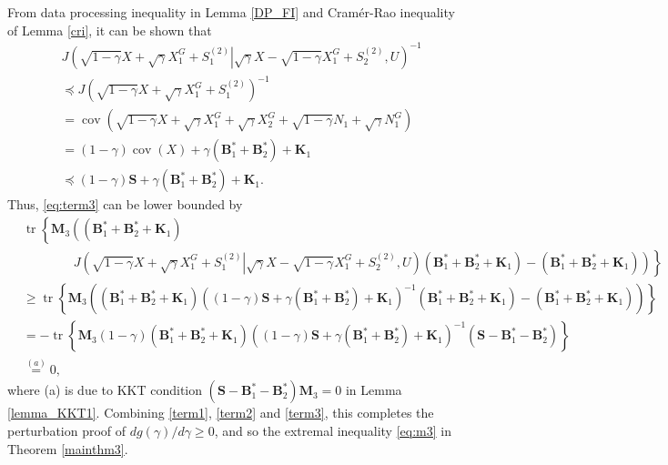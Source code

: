 \documentclass[journal,final, onecolumn]{IEEEtran}
\DeclareMathOperator{\tr}{tr}
\DeclareMathOperator{\cov}{cov}
\begin{document}
From data processing inequality in Lemma \ref{DP_FI} and Cram\'{e}r-Rao inequality of Lemma \ref{cri}, it can be shown that
\begin{align}
& J   \left( \left. \sqrt{1-\gamma}X+\sqrt{\gamma}X^{G}_{1}+S^{(2)}_{1} \right| \sqrt{\gamma}X-\sqrt{1-\gamma}X_{1}^{G}+S^{(2)}_{2}, U  \right)^{-1} \nonumber \\
& \preceq J   \left(  \sqrt{1-\gamma}X+\sqrt{\gamma}X^{G}_{1}+S^{(2)}_{1} \right)^{-1}\\
&= \cov \left(    \sqrt{1-\gamma}X+\sqrt{\gamma}X^{G}_{1}+ \sqrt{\gamma}X_{2}^{G}+\sqrt{1-\gamma}N_{1} + \sqrt{\gamma} N^{G}_{1}    \right)\\
&=(1-\gamma) \cov(X) + \gamma (\boldsymbol{B}_{1}^{*} + \boldsymbol{B}_{2}^{*} )+ \boldsymbol{K}_{1} \\
& \preceq (1-\gamma) \boldsymbol{S} + \gamma (\boldsymbol{B}_{1}^{*} + \boldsymbol{B}_{2}^{*} )+ \boldsymbol{K}_{1}.
\end{align}
Thus, \eqref{eq:term3} can be lower bounded by
\begin{align}
& \tr \left\{     \boldsymbol{M}_{3} \left(  \left( \boldsymbol{B}_1^{*}+ \boldsymbol{B}_2^{*} + \boldsymbol{K}_{1}     \right) \right.\right. \nonumber \\
& \qquad\qquad\left.\left.    J   \left( \left. \sqrt{1-\gamma}X+\sqrt{\gamma}X^{G}_{1}+S^{(2)}_{1} \right| \sqrt{\gamma}X-\sqrt{1-\gamma}X_{1}^{G}+S^{(2)}_{2}, U  \right) \left( \boldsymbol{B}_1^{*}+ \boldsymbol{B}_2^{*} + \boldsymbol{K}_{1}     \right)  -\left(  \boldsymbol{B}_1^{*}+\boldsymbol{B}_2^{*} + \boldsymbol{K}_{1}     \right)\right)     \right\} \nonumber \\
& \geq \tr \left\{    \boldsymbol{M}_{3}  \left(  \left( \boldsymbol{B}_1^{*}+ \boldsymbol{B}_2^{*} + \boldsymbol{K}_{1}     \right) \left(   (1-\gamma) \boldsymbol{S} + \gamma (\boldsymbol{B}_{1}^{*} + \boldsymbol{B}_{2}^{*} )+ \boldsymbol{K}_{1} \right)^{-1} \left( \boldsymbol{B}_1^{*}+ \boldsymbol{B}_2^{*} + \boldsymbol{K}_{1}     \right)  -\left(  \boldsymbol{B}_1^{*}+\boldsymbol{B}_2^{*} + \boldsymbol{K}_{1}     \right)\right)     \right\} \\
&= -\tr\left\{  \boldsymbol{M}_{3} (1-\gamma)\left( \boldsymbol{B}_1^{*}+ \boldsymbol{B}_2^{*} + \boldsymbol{K}_{1}     \right) \left(   (1-\gamma) \boldsymbol{S} + \gamma (\boldsymbol{B}_{1}^{*} + \boldsymbol{B}_{2}^{*} )+ \boldsymbol{K}_{1} \right)^{-1}\left( \boldsymbol{S} - \boldsymbol{B}^{*}_{1} - \boldsymbol{B}^{*}_{2}\right)           \right\}\\
&\overset{(a)}=0,\label{term3}
\end{align}
where (a) is due to KKT condition $\left( \boldsymbol{S} - \boldsymbol{B}^{*}_{1} - \boldsymbol{B}^{*}_{2}\right)\boldsymbol{M}_{3} =0$ in Lemma \ref{lemma_KKT1}.
Combining \eqref{term1}, \eqref{term2} and \eqref{term3}, this completes the perturbation proof of $dg(\gamma)/d\gamma \geq 0$, and so the extremal inequality \eqref{eq:m3} in Theorem \ref{mainthm3}.
\end{document}
